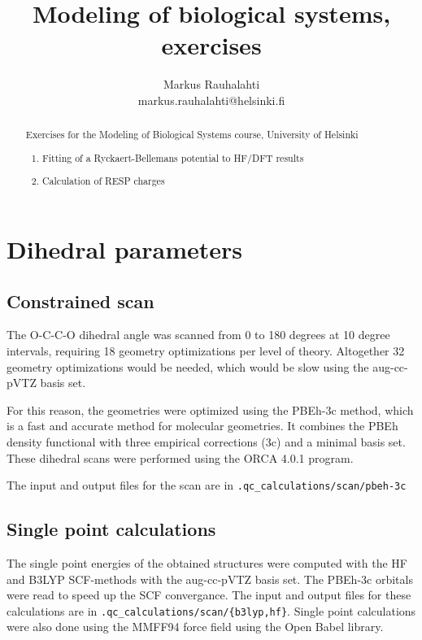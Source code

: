 \documentclass[10pt]{article}
\title{Modeling of biological systems, exercises}
\author{Markus Rauhalahti\\
	markus.rauhalahti@helsinki.fi}
\begin{document}
\maketitle
\tableofcontents

\begin{abstract}
	\noindent Exercises for the Modeling of Biological Systems course, University of Helsinki
	\begin{enumerate}
	\item Fitting of a Ryckaert-Bellemans potential to HF/DFT results
	\item Calculation of RESP charges
	\end{enumerate}
\end{abstract}

\newpage



\section{Dihedral parameters}

\subsection{Constrained scan}

The O-C-C-O dihedral angle was scanned from 0 to 180 degrees at 10 degree intervals, requiring 18 geometry optimizations per level of theory. Altogether 32 geometry optimizations would be needed, which would be slow using the aug-cc-pVTZ basis set.

For this reason, the geometries were optimized using the  PBEh-3c method, which is a fast and accurate method for molecular geometries\cite{pbeh3c}. It combines the PBEh density functional with three empirical corrections (3c) and a minimal basis set. These dihedral scans were performed using the ORCA 4.0.1 program\cite{orca}.

The input and output files for the scan are in \texttt{.qc\_calculations/scan/pbeh-3c}

\subsection{Single point calculations}


The single point energies of the obtained structures were computed with the HF and B3LYP\cite{b3lyp1, b3lyp2} SCF-methods with the aug-cc-pVTZ\cite{augccpvtz} basis set. The PBEh-3c orbitals were read to speed up the SCF convergance. The input and output files for these calculations are in \texttt{.qc\_calculations/scan/\{b3lyp,hf\}}. Single point calculations were also done using the MMFF94\cite{mmff94} force field using the Open Babel library\cite{openbabel}.
\end{document}
